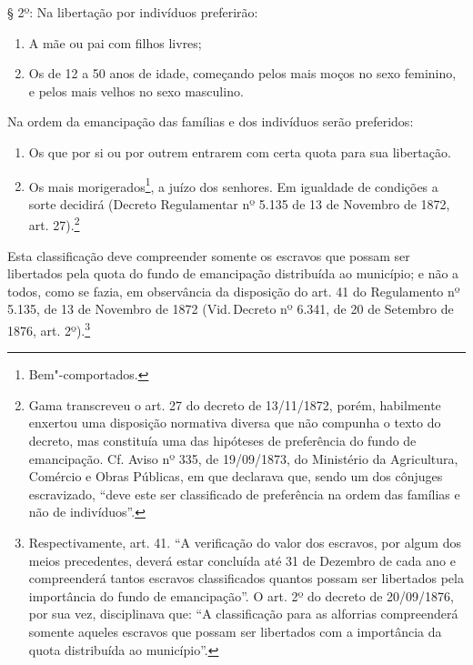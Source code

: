 § 2º: Na libertação por indivíduos preferirão:

\begin{enumerate}[label={\scshape\roman*.}]
\item A mãe ou pai com filhos livres;

\item Os de 12 a 50 anos de idade, começando pelos mais moços no sexo
feminino, e pelos mais velhos no sexo masculino.
\end{enumerate}

Na ordem da emancipação das famílias e dos indivíduos serão preferidos:

\begin{enumerate}[label=\arabic*º]
\item Os que por si ou por outrem entrarem com certa quota para sua
libertação.

\item Os mais morigerados\footnote{Bem"-comportados.}, a juízo dos
senhores. Em igualdade de condições a sorte decidirá (Decreto
Regulamentar nº 5.135 de 13 de Novembro de 1872, art. 27).\footnote{
  Gama transcreveu o art. 27 do decreto de 13/11/1872, porém, habilmente
  enxertou uma disposição normativa diversa que não compunha o texto do
  decreto, mas constituía uma das hipóteses de preferência do
  fundo de emancipação. Cf. Aviso nº 335, de 19/09/1873, do Ministério
  da Agricultura, Comércio e Obras Públicas, em que declarava que, sendo
  um dos cônjuges escravizado, ``deve este ser classificado de
  preferência na ordem das famílias e não de indivíduos''.}
\end{enumerate}  

Esta classificação deve compreender somente os escravos que possam ser
libertados pela quota do fundo de emancipação distribuída ao município;
e não a todos, como se fazia, em observância da disposição do art. 41 do
Regulamento nº 5.135, de 13 de Novembro de 1872 (Vid.\,Decreto nº 6.341,
de 20 de Setembro de 1876, art. 2º).\footnote{Respectivamente, art.
  41. ``A verificação do valor dos escravos, por algum dos meios
  precedentes, deverá estar concluída até 31 de Dezembro de cada ano e
  compreenderá tantos escravos classificados quantos possam ser
  libertados pela importância do fundo de emancipação''. O art. 2º do
  decreto de 20/09/1876, por sua vez, disciplinava que: ``A classificação
  para as alforrias compreenderá somente aqueles escravos que possam ser
  libertados com a importância da quota distribuída ao município''.}

